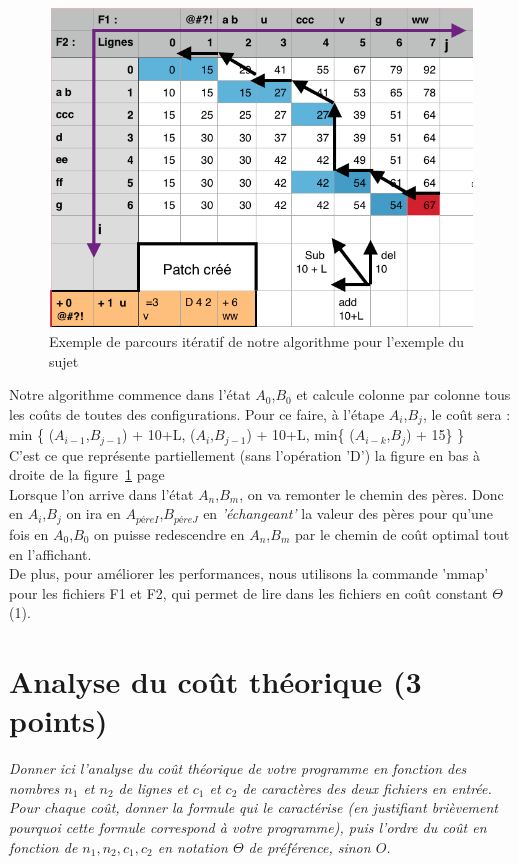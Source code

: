 \documentclass[a4paper, 10pt, french]{article}
\begin{document}
{\begin{figure}[!h]
\hspace{2cm}
	\includegraphics[scale=0.5]{tableau_mem.png}
	\caption{\label{étiquette} Exemple de parcours itératif de notre algorithme pour l'exemple du sujet}
\end{figure}
 \indent Notre algorithme commence dans l'état $A_0$,$B_0$ et calcule colonne par colonne tous les coûts de toutes des configurations. Pour ce faire, à l'étape $A_i$,$B_j$, le coût sera : \\ min \{ ($A_{i-1}$,$B_{j-1}$) + 10+L, ($A_i$,$B_{j-1}$) + 10+L, min\{ ($A_{i-k}$,$B_j$) + 15\} \}
 \\ C'est ce que représente partiellement (sans l'opération 'D') la figure en bas à droite de la figure~\ref{étiquette} page~\pageref{étiquette} 
 \\ \indent Lorsque l'on arrive dans l'état $A_n$,$B_m$, on va remonter le chemin des pères. Donc en $A_i$,$B_j$ on ira en $A_{péreI}$,$B_{péreJ}$ en {\em 'échangeant'} la valeur des pères pour qu'une fois en $A_0$,$B_0$ on puisse redescendre en $A_n$,$B_m$ par le chemin de coût optimal tout en l'affichant.
 \\ \indent De plus, pour améliorer les performances, nous utilisons la commande 'mmap' pour les fichiers F1 et F2, qui permet de lire dans les fichiers en coût constant $\Theta$(1).
 } 

\section{Analyse du coût théorique (3 points)}
{\em Donner ici l'analyse du coût théorique de votre programme en fonction des nombres $n_1$ et $n_2$ de lignes 
et $c_1$ et $c_2$ de caractères des deux fichiers en entrée.
 Pour chaque coût, donner la formule qui le caractérise (en justifiant brièvement pourquoi cette formule correspond à votre programme), 
 puis l'ordre du coût en fonction de $n_1, n_2, c_1, c_2$ en notation $\Theta$ de préférence, sinon $O$.}
\end{document}

